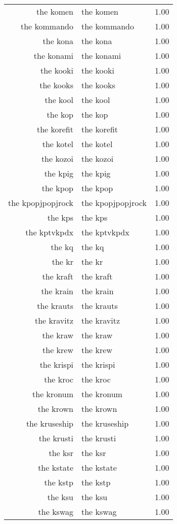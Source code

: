 \begin{table}[ht]
\begin{tabular}{rlr}
  the komen & the komen & 1.00 \\ 
  the kommando & the kommando & 1.00 \\ 
  the kona & the kona & 1.00 \\ 
  the konami & the konami & 1.00 \\ 
  the kooki & the kooki & 1.00 \\ 
  the kooks & the kooks & 1.00 \\ 
  the kool & the kool & 1.00 \\ 
  the kop & the kop & 1.00 \\ 
  the korefit & the korefit & 1.00 \\ 
  the kotel & the kotel & 1.00 \\ 
  the kozoi & the kozoi & 1.00 \\ 
  the kpig & the kpig & 1.00 \\ 
  the kpop & the kpop & 1.00 \\ 
  the kpopjpopjrock & the kpopjpopjrock & 1.00 \\ 
  the kps & the kps & 1.00 \\ 
  the kptvkpdx & the kptvkpdx & 1.00 \\ 
  the kq & the kq & 1.00 \\ 
  the kr & the kr & 1.00 \\ 
  the kraft & the kraft & 1.00 \\ 
  the krain & the krain & 1.00 \\ 
  the krauts & the krauts & 1.00 \\ 
  the kravitz & the kravitz & 1.00 \\ 
  the kraw & the kraw & 1.00 \\ 
  the krew & the krew & 1.00 \\ 
  the krispi & the krispi & 1.00 \\ 
  the kroc & the kroc & 1.00 \\ 
  the kronum & the kronum & 1.00 \\ 
  the krown & the krown & 1.00 \\ 
  the kruseship & the kruseship & 1.00 \\ 
  the krusti & the krusti & 1.00 \\ 
  the ksr & the ksr & 1.00 \\ 
  the kstate & the kstate & 1.00 \\ 
  the kstp & the kstp & 1.00 \\ 
  the ksu & the ksu & 1.00 \\ 
  the kswag & the kswag & 1.00 \\ 

\end{tabular}
\end{table}
